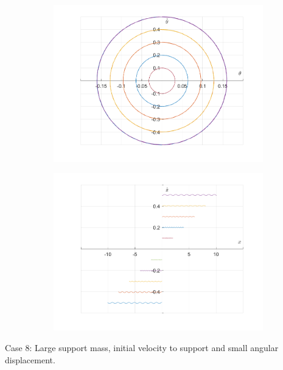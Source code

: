 \documentclass{article}
\begin{document}
	\begin{figure}[h!]
		\centering
		\begin{subfigure}[b]{0.48\linewidth}
			\includegraphics[width=\linewidth]{./SmallOscillations/S7/F5.png}
		\end{subfigure}
		\begin{subfigure}[b]{0.48\linewidth}
			\includegraphics[width=\linewidth]{./SmallOscillations/S7/F6.png}
		\end{subfigure}
	\end{figure}
	\newpage
	Case 8:
	Large support mass, initial velocity to support and small angular displacement.
\end{document}
